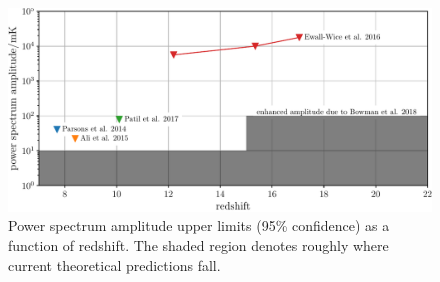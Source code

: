 \begin{bibunit}
\begin{figure}[t]
    \centering
    \includegraphics[width=\textwidth]{figures/chapter1/power-spectrum-upper-limits/power-spectrum-upper-limits}
    \caption{
        Power spectrum amplitude upper limits (95\% confidence) as a function of redshift. The
        shaded region denotes roughly where current theoretical predictions fall.
    }
    \label{fig:power-spectrum-upper-limits}
\end{figure}












\end{bibunit}


